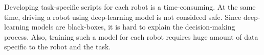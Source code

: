 

Developing task-specific scripts for each robot is a time-consuming.
At the same time, driving a robot using deep-learning model is not consideed safe. Since deep-learning models are black-boxes, it is hard to explain the decision-making process.
Also, training such a model for each robot requires huge amount of data specific to the robot and the task.
